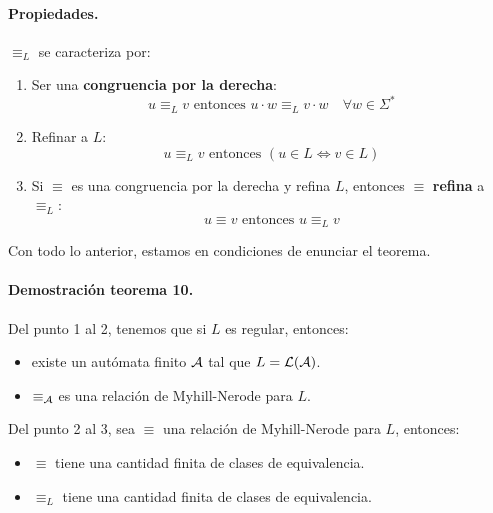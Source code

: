\paragraph{Propiedades.} $\equiv_L$ se caracteriza por:
\begin{enumerate}
    \item Ser una \textbf{congruencia por la derecha}:
          $$
              u \equiv_L v \text { entonces } u \cdot w \equiv_L v \cdot w \quad \forall w \in \Sigma^*
          $$
    \item Refinar a $L$:
          $$
              u \equiv_L v \text { entonces }(u \in L \Leftrightarrow v \in L)
          $$
    \item Si $\equiv$ es una congruencia por la derecha y refina $L$, entonces $\equiv$ \textbf{refina} a $\equiv_L$:
          $$
              u \equiv v \text { entonces } u \equiv_L v
          $$
\end{enumerate}

Con todo lo anterior, estamos en condiciones de enunciar el teorema.


\paragraph{Demostración teorema 10.} Del punto 1 al 2, tenemos que si $L$ es regular, entonces:
\begin{itemize}
    \item existe un autómata finito $\mathcal{A}$ tal que $L = \mathcal{L}(\mathcal{A})$.
    \item $\equiv_{\mathcal{A}}$ es una relación de Myhill-Nerode para $L$.
\end{itemize}

Del punto 2 al 3, sea $\equiv$ una relación de Myhill-Nerode para $L$, entonces:
\begin{itemize}
    \item $\equiv$ tiene una cantidad finita de clases de equivalencia.
    \item $\equiv_L$ tiene una cantidad finita de clases de equivalencia.
\end{itemize}

